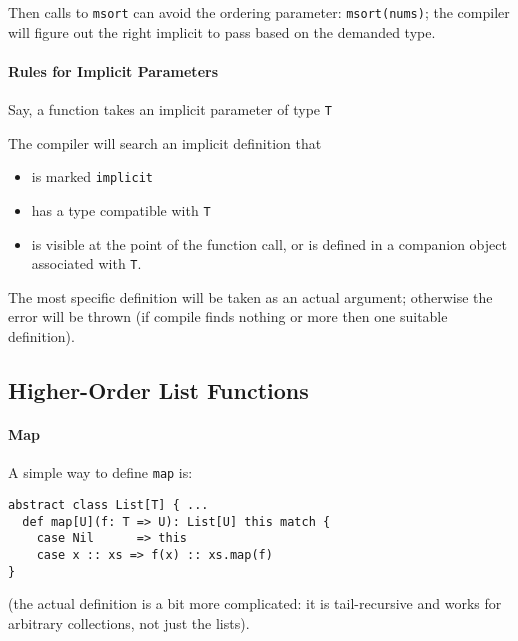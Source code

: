 \documentclass{scrartcl}
\begin{document}
Then calls to \lstinline|msort| can avoid the ordering parameter: 
\lstinline|msort(nums)|; the compiler will figure out the right implicit to pass
based on the demanded type.

\paragraph{Rules for Implicit Parameters}

Say, a function takes an implicit parameter of type \lstinline|T|

The compiler will search an implicit definition that
\begin{itemize}
\item is marked \lstinline|implicit|
\item has a type compatible with \lstinline|T|
\item is visible at the point of the function call, or is defined in a companion
  object associated with \lstinline|T|.
\end{itemize}

The most specific definition will be taken as an actual argument; otherwise the
error will be thrown (if compile finds nothing or more then one suitable
definition). 

\subsection{Higher-Order List Functions}
\label{sec:HigherOrderListFunctions}

\paragraph{Map}
A simple way to define \lstinline|map| is:
\begin{lstlisting}
abstract class List[T] { ...
  def map[U](f: T => U): List[U] this match {
    case Nil      => this
    case x :: xs => f(x) :: xs.map(f)
}
\end{lstlisting}
(the actual definition is a bit more complicated: it is tail-recursive and works
for arbitrary collections, not just the lists).
\end{document}
